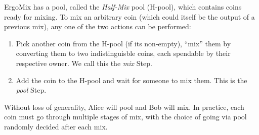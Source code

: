 \documentclass[11pt]{article}
\newcommand{\mixname}{ErgoMix\xspace}
\begin{document}
\mixname has a pool, called the {\em Half-Mix} pool (H-pool), which contains coins ready for mixing. 
To mix an arbitrary coin (which could itself be the output of a previous mix), any one of the two actions can be performed:
\begin{enumerate}
	\item Pick another coin from the H-pool (if its non-empty), ``mix'' them by converting them to two indistinguisble coins, each spendable by their respective owner. We call this the {\em mix} Step.
	\item Add the coin to the H-pool and wait for someone to mix them. This is the {\em pool} Step.
\end{enumerate}

Without loss of generality, Alice will pool and Bob will mix. In practice, each coin must go through multiple stages of mix, with the choice of going via pool randomly decided after each mix.
\end{document}
